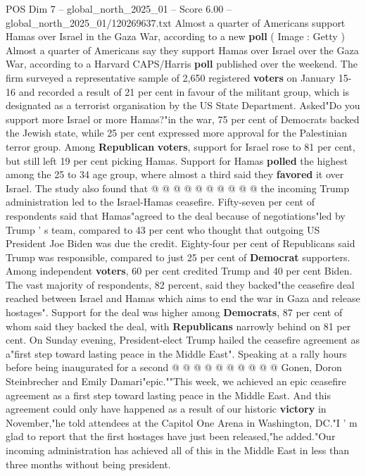\begin{textsample}{POS Dim 7 – global\_north\_2025\_01 – Score 6.00 – global\_north\_2025\_01/120269637.txt}  \label{ex:f7_pos_271}
Almost a quarter of Americans support Hamas over Israel in the Gaza War, according to a new \textbf{poll} ( Image : Getty ) Almost a quarter of Americans say they support Hamas over Israel over the Gaza War, according to a Harvard CAPS/Harris \textbf{poll} published over the weekend.
The firm surveyed a representative sample of 2,650 registered \textbf{voters} on January 15-16 and recorded a result of 21 per cent in favour of the militant group, which is designated as a terrorist organisation by the US State Department.
Asked"Do you support more Israel or more Hamas?"in the war, 75 per cent of Democrats backed the Jewish state, while 25 per cent expressed more approval for the Palestinian terror group.
Among \textbf{Republican} \textbf{voters}, support for Israel rose to 81 per cent, but still left 19 per cent picking Hamas.
Support for Hamas \textbf{polled} the highest among the 25 to 34 age group, where almost a third said they \textbf{favored} it over Israel.
The study also found that @ @ @ @ @ @ @ @ @ @ the incoming Trump administration led to the Israel-Hamas ceasefire.
Fifty-seven per cent of respondents said that Hamas"agreed to the deal because of negotiations"led by Trump ' s team, compared to 43 per cent who thought that outgoing US President Joe Biden was due the credit.
Eighty-four per cent of Republicans said Trump was responsible, compared to just 25 per cent of \textbf{Democrat} supporters.
Among independent \textbf{voters}, 60 per cent credited Trump and 40 per cent Biden.
The vast majority of respondents, 82 percent, said they backed"the ceasefire deal reached between Israel and Hamas which aims to end the war in Gaza and release hostages".
Support for the deal was higher among \textbf{Democrats}, 87 per cent of whom said they backed the deal, with \textbf{Republicans} narrowly behind on 81 per cent.
On Sunday evening, President-elect Trump hailed the ceasefire agreement as a"first step toward lasting peace in the Middle East".
Speaking at a rally hours before being inaugurated for a second @ @ @ @ @ @ @ @ @ @ Gonen, Doron Steinbrecher and Emily Damari"epic.""This week, we achieved an epic ceasefire agreement as a first step toward lasting peace in the Middle East.
And this agreement could only have happened as a result of our historic \textbf{victory} in November,"he told attendees at the Capitol One Arena in Washington, DC."I ' m glad to report that the first hostages have just been released,"he added."Our incoming administration has achieved all of this in the Middle East in less than three months without being president.

\end{textsample}
